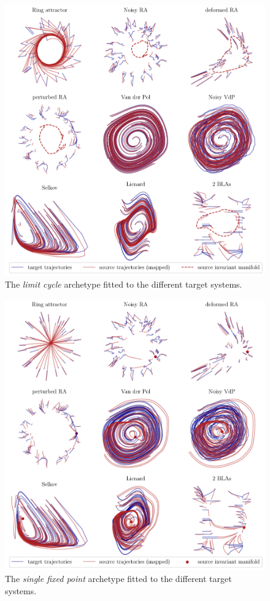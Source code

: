\documentclass{article}
\theoremstyle{definition} \newtheorem{definition}{Definition}  \newtheorem{example}{Example}
\theoremstyle{remark} \newtheorem{remark}{Remark}
\begin{document}
\begin{figure}[htbp]
    \centering
    \includegraphics[width=0.95\linewidth]{lc_traj_invman}
    \caption{The \emph{limit cycle} archetype fitted to the different target systems.
    }
    \label{fig:lc_traj_invman}
\end{figure}

\begin{figure}[htbp]
    \centering
    \includegraphics[width=0.95\linewidth]{lds_traj_invman}
    \caption{The \emph{single fixed point} archetype fitted to the different target systems.
    }
    \label{fig:lds_traj_invman}
\end{figure}
\end{document}
